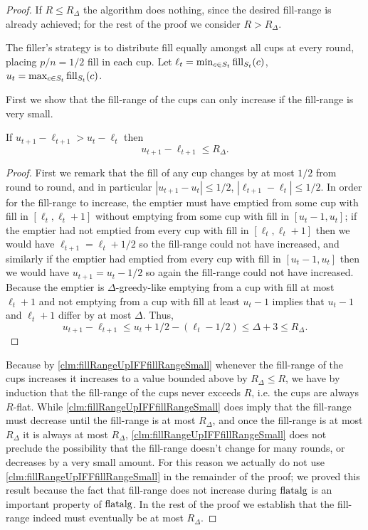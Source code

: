 \begin{proof}
  If $R \le R_\Delta$ the algorithm does nothing, since the
  desired fill-range is already achieved; for
  the rest of the proof we consider $R > R_\Delta$.

  The filler's strategy is to distribute fill equally amongst all
  cups at every round, placing $p/n = 1/2$ fill in each cup. 
  Let $\ell_t = \min_{c\in S_t} \operatorname{\text{\textup{fill}}}_{S_t}(c)$, $u_t = \max_{c\in S_t} \operatorname{\text{\textup{fill}}}_{S_t}(c)$. 

  First we show that the fill-range of the cups can only increase
  if the fill-range is very small.
  \begin{clm}
    \label{clm:fillRangeUpIFFfillRangeSmall}
    If $u_{t+1}-\ell_{t+1} > u_t - \ell_t$ then 
    $$u_{t+1} - \ell_{t+1} \le R_\Delta.$$
  \end{clm}
  \begin{proof}
    First we remark that the fill of any cup changes by at most
    $1/2$ from round to round, and in particular $|u_{t+1}-u_t|
    \le 1/2$, $|\ell_{t+1} - \ell_t|\le 1/2$.
  In order for the fill-range to increase, the emptier must have
  emptied from some cup with fill in $[\ell_t, \ell_t + 1]$ without
  emptying from some cup with fill in $[u_t-1, u_t]$; if the emptier
  had not emptied from every cup with fill in $[\ell_t, \ell_t+1]$
  then we would have $\ell_{t+1} = \ell_t + 1/2$ so the
  fill-range could not have increased, and similarly if the emptier
  had emptied from every cup with fill in $[u_t-1, u_t]$ then we
  would have $u_{t+1} = u_t - 1/2$ so again the fill-range could
  not have increased. Because the emptier is $\Delta$-greedy-like
  emptying from a cup with fill at most $\ell_t+1$ and not
  emptying from a cup with fill at least $u_t-1$ implies that
  $u_t-1$ and $\ell_t+1$ differ by at most $\Delta$.
  Thus, 
  $$u_{t+1} - \ell_{t+1} \le u_t +1/2 - (\ell_t -1/2)  \le \Delta + 3 \le R_\Delta.$$
  \end{proof}
  Because by
  \cref{clm:fillRangeUpIFFfillRangeSmall}
  whenever the fill-range of the cups increases it increases to a
  value bounded above by $R_\Delta \le R$, we have by induction
  that the fill-range of the cups never exceeds $R$, i.e. the
  cups are always $R$-flat. While
  \cref{clm:fillRangeUpIFFfillRangeSmall}
  does imply that the fill-range must decrease until the
  fill-range is at most $R_\Delta$, and once the fill-range is at
  most $R_\Delta$ it is always at most $R_\Delta$,
  \cref{clm:fillRangeUpIFFfillRangeSmall}
  does not preclude the possibility that the fill-range doesn't
  change for many rounds, or decreases by a very small amount.
  For this reason we actually do not use
  \cref{clm:fillRangeUpIFFfillRangeSmall}
  in the remainder of the proof; we proved this result because
  the fact that fill-range does not increase during $\operatorname{\text{\textup{flatalg}}}$ is
  an important property of $\operatorname{\text{\textup{flatalg}}}$. In the rest of the proof
  we establish that the fill-range indeed must eventually be at
  most $R_\Delta$.


\end{proof}
